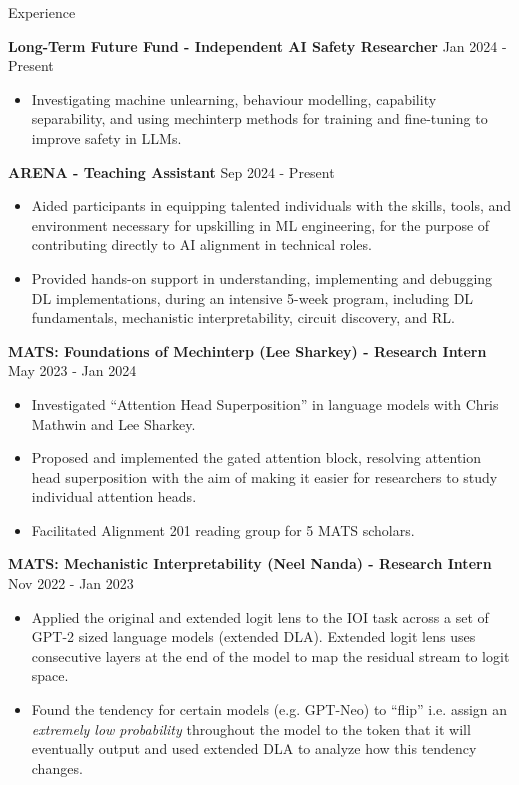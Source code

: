 \documentclass[hidelinks]{resume} %
\begin{document}
\begin{rSection}{Experience}
    
\textbf{Long-Term Future Fund - Independent AI Safety Researcher}
\hfill {Jan 2024 - Present}
\begin{itemize}
    \item Investigating machine unlearning, behaviour modelling, capability separability, and using mechinterp methods for training and fine-tuning to improve safety in LLMs.
\end{itemize}

\textbf{ARENA - Teaching Assistant}
\hfill{Sep 2024 - Present}
\begin{itemize}
    \item Aided participants in equipping talented individuals with the skills, tools, and environment necessary for upskilling in ML engineering, for the purpose of contributing directly to AI alignment in technical roles.
    \item Provided hands-on support in understanding, implementing and debugging DL implementations, during an intensive 5-week program, including DL fundamentals, mechanistic interpretability, circuit discovery, and RL.
\end{itemize}

\textbf{MATS: Foundations of Mechinterp (Lee Sharkey) - Research Intern}
\hfill {May 2023 - Jan 2024}
\begin{itemize}
    \item Investigated ``Attention Head Superposition'' in language models with Chris Mathwin and Lee Sharkey.
    \item Proposed and implemented the gated attention block, resolving attention head superposition with the aim of making it easier for researchers to study individual attention heads.
    \item Facilitated Alignment 201 reading group for 5 MATS scholars.
\end{itemize}

\textbf{MATS: Mechanistic Interpretability (Neel Nanda) - Research Intern}
\hfill {Nov 2022 - Jan 2023}
\begin{itemize}
    \item Applied the original and extended logit lens to the IOI task across a set of GPT-2 sized language models (extended DLA). Extended logit lens uses consecutive layers at the end of the model to map the residual stream to logit space.
    \item Found the tendency for certain models (e.g. GPT-Neo) to ``flip'' i.e. assign an \textit{extremely low probability} throughout the model to the token that it will eventually output and used extended DLA to analyze how this tendency changes.
\end{itemize}


\end{rSection}
\end{document}
